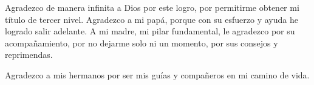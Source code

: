 \clearpage
{}
\vspace*{\fill}
\hfill\begin{minipage}{0.72\textwidth}\setlength{\parskip}{12pt}\setlength{\parindent}{0pt}
Agradezco de manera infinita a Dios por este logro, por permitirme obtener mi título
de tercer nivel. Agradezco a mi papá, porque con su esfuerzo y ayuda he logrado salir
adelante. A mi madre, mi pilar fundamental, le agradezco por su acompañamiento, por no
dejarme solo ni un momento, por sus consejos y reprimendas.

Agradezco a mis hermanos por ser mis guías y compañeros en mi camino de vida.
\end{minipage}
\vspace{4mm}
